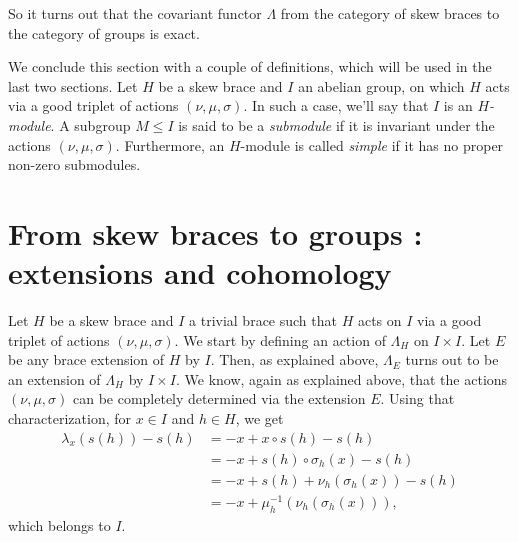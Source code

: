 \documentclass[11pt]{amsart}
\theoremstyle{thrm}
\theoremstyle{plain}
\theoremstyle{definition}
\numberwithin{equation}{section}
\begin{document}
So it turns out that  the covariant functor $\Lambda$ from the category of skew braces to the category of groups is exact. 



We conclude  this section with a couple of definitions, which will be used in the last two sections. Let $H$ be a skew  brace and $I$  an abelian group, on which $H$ acts via a good triplet of actions $(\nu, \mu, \sigma)$. In such a case, we'll say that $I$ is an {\it $H$-module}.   A subgroup \(M \leq I\) is said to be  a {\it submodule} if it is invariant under the actions \((\nu, \mu, \sigma)\). Furthermore, an \(H\)-module is called \emph{simple} if it has no proper non-zero submodules.





\section{From skew braces to groups : extensions and cohomology}


Let $H$ be a skew brace and $I$  a trivial brace such that $H$ acts on $I$ via a good triplet of actions $(\nu, \mu, \sigma)$. We start by defining an action of $\Lambda_H$ on $I \times I$. Let $E$ be any brace extension of $H$ by $I$. Then, as explained above,  $\Lambda_E$ turns out to be an extension of $\Lambda_H$ by $I \times I$. We know, again as explained above, that the actions $(\nu, \mu, \sigma)$ can be completely determined via the extension $E$. Using that characterization, for  $x \in I$ and $h \in H$, we get
\begin{align}\label{action1}
	\lambda_x(s(h))-s(h) &= -x+ x \circ s(h)-s(h) \nonumber \\
	&=-x+ s(h) \circ \sigma_h(x)-s(h) \nonumber\\
	&=-x+ s(h)+\nu_h(\sigma_h(x))-s(h) \nonumber\\
	&=-x +\mu_{h}^{-1}(\nu_h(\sigma_h(x))),
\end{align} 
which belongs to $I$. 
\end{document}
